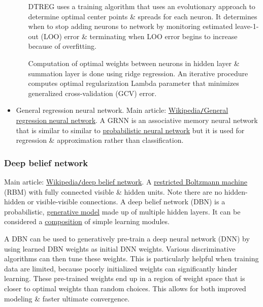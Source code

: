 \documentclass{article}
\begin{document}
\begin{itemize}
\begin{itemize}
		DTREG uses a training algorithm that uses an evolutionary approach to determine optimal center points \& spreads for each neuron. It determines when to stop adding neurons to network by monitoring estimated leave-1-out (LOO) error \& terminating when LOO error begins to increase because of overfitting.
		
		Computation of optimal weights between neurons in hidden layer \& summation layer is done using ridge regression. An iterative procedure computes optimal regularization Lambda parameter that minimizes generalized cross-validation (GCV) error.
	\end{itemize}
	\item {\sf General regression neural network.} Main article: \href{https://en.wikipedia.org/wiki/General_regression_neural_network}{Wikipedia{\tt/}General regression neural network}. A GRNN is an associative memory neural network that is similar to similar to \href{https://en.wikipedia.org/wiki/Probabilistic_neural_network}{probabilistic neural network} but it is used for regression \& approximation rather than classification.
\end{itemize}

\subsubsection{Deep belief network}
Main article: \href{https://en.wikipedia.org/wiki/Deep_belief_network}{Wikipedia{\tt/}deep belief network}. {\sf A \href{https://en.wikipedia.org/wiki/Restricted_Boltzmann_machine}{restricted Boltzmann machine} (RBM) with fully connected visible \& hidden units. Note there are no hidden-hidden or visible-visible connections.} A deep belief network (DBN) is a probabilistic, \href{https://en.wikipedia.org/wiki/Generative_model}{generative model} made up of multiple hidden layers. It can be considered a \href{https://en.wikipedia.org/wiki/Function_composition}{composition} of simple learning modules.

A DBN can be used to generatively pre-train a deep neural network (DNN) by using learned DBN weights as initial DNN weights. Various discriminative algorithms can then tune these weights. This is particularly helpful when training data are limited, because poorly initialized weights can significantly hinder learning. These pre-trained weights end up in a region of weight space that is closer to optimal weights than random choices. This allows for both improved modeling \& faster ultimate convergence.
\end{document}
